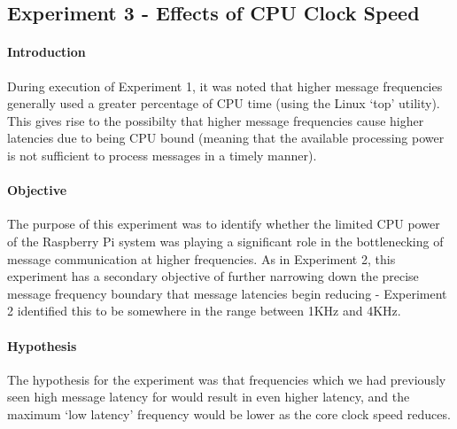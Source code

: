 \documentclass[../dissertation.tex]{subfiles}
\begin{document}
\subsection{Experiment 3 - Effects of CPU Clock Speed}
\label{experiment3-cpu-speed}

\paragraph{Introduction} During execution of Experiment 1, it was noted that higher message frequencies generally used a greater percentage of CPU time (using the Linux `top' utility). This gives rise to the possibilty that higher message frequencies cause higher latencies due to being CPU bound (meaning that the available processing power is not sufficient to process messages in a timely manner).

\paragraph{Objective} The purpose of this experiment was to identify whether the limited CPU power of the Raspberry Pi system was playing a significant role in the bottlenecking of message communication at higher frequencies. As in Experiment 2, this experiment has a secondary objective of further narrowing down the precise message frequency boundary that message latencies begin reducing - Experiment 2 identified this to be somewhere in the range between 1KHz and 4KHz.

\paragraph{Hypothesis} The hypothesis for the experiment was that frequencies which we had previously seen high message latency for would result in even higher latency, and the maximum `low latency' frequency would be lower as the core clock speed reduces.
\end{document}
